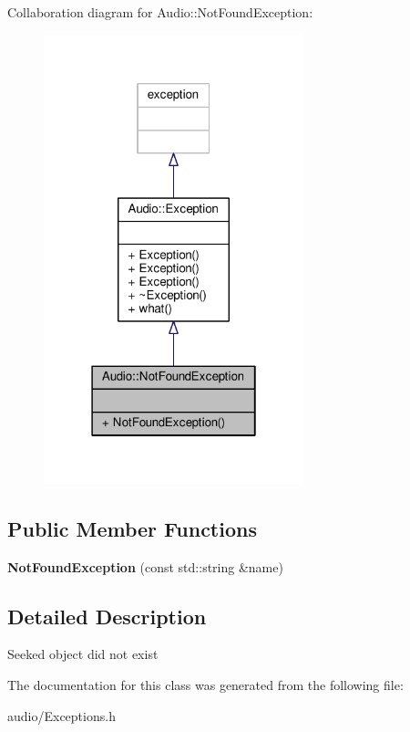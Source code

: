 Collaboration diagram for Audio\+:\+:Not\+Found\+Exception\+:
\nopagebreak
\begin{figure}[H]
\begin{center}
\leavevmode
\includegraphics[width=214pt]{dd/d8b/classAudio_1_1NotFoundException__coll__graph}
\end{center}
\end{figure}
\subsection*{Public Member Functions}
\begin{DoxyCompactItemize}
\item 
{\bfseries Not\+Found\+Exception} (const std\+::string \&name)\hypertarget{classAudio_1_1NotFoundException_ae87edd60dd5c4a5523a7301b92b8a6d8}{}\label{classAudio_1_1NotFoundException_ae87edd60dd5c4a5523a7301b92b8a6d8}

\end{DoxyCompactItemize}


\subsection{Detailed Description}
Seeked object did not exist 

The documentation for this class was generated from the following file\+:\begin{DoxyCompactItemize}
\item 
audio/Exceptions.\+h\end{DoxyCompactItemize}
